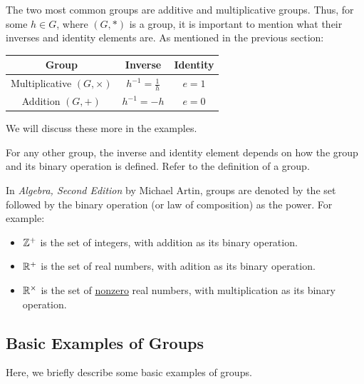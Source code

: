 \documentclass[letterpaper]{article}
\begin{document}
\begin{note*}{}{}
    The two most common groups are additive and multiplicative groups. Thus, for some $h \in G$, where $(G, *)$ is a group, it is important to mention what their inverses and identity elements are. As mentioned in the previous section:
    \begin{center}
        \begin{tabular}{|c|c|c|}
            \hline 
            \textbf{Group} & \textbf{Inverse} & \textbf{Identity} \\ 
            \hline 
            Multiplicative $(G, \times)$ & $h^{-1} = \frac{1}{h}$ & $e = 1$ \\ 
            Addition $(G, +)$ & $h^{-1} = -h$ & $e = 0$ \\ 
            \hline 
        \end{tabular}
    \end{center}
    We will discuss these more in the examples. 

    \bigskip 

    For any other group, the inverse and identity element depends on how the group and its binary operation is defined. Refer to the definition of a group.
\end{note*}

\begin{note*}{}{}
    In \emph{Algebra, Second Edition} by Michael Artin, groups are denoted by the set followed by the binary operation (or law of composition) as the power. For example: 
    \begin{itemize}
        \item $\mathbb{Z}^+$ is the set of integers, with addition as its binary operation.
        \item $\mathbb{R}^+$ is the set of real numbers, with adition as its binary operation. 
        \item $\mathbb{R}^{\times}$ is the set of \underline{nonzero} real numbers, with multiplication as its binary operation.
    \end{itemize} 
\end{note*}

\subsection{Basic Examples of Groups}
Here, we briefly describe some basic examples of groups. 
\end{document}
